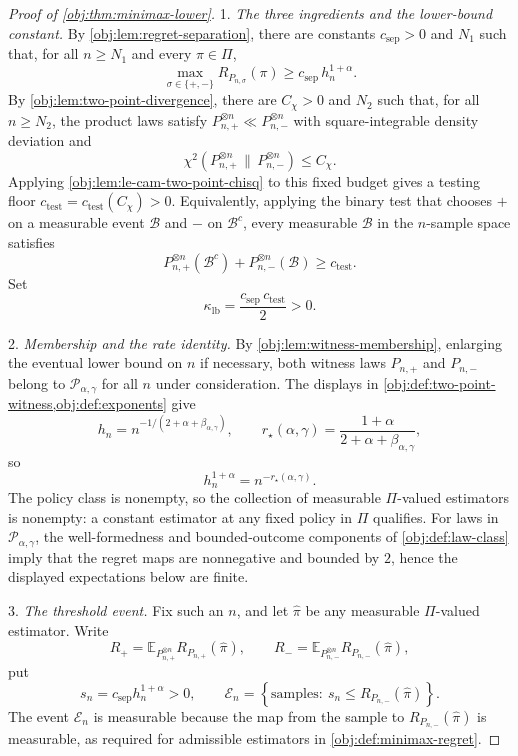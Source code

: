\begin{proof}[Proof of \cref{obj:thm:minimax-lower}]
1. \emph{The three ingredients and the lower-bound constant.}  By \cref{obj:lem:regret-separation}, there are constants \(c_{\mathrm{sep}}>0\) and \(N_1\) such that, for all \(n\ge N_1\) and every \(\pi\in\Pi\),
\[
\max_{\sigma\in\{+,-\}} R_{P_{n,\sigma}}(\pi)
\ge
c_{\mathrm{sep}}\,h_n^{1+\alpha}.
\]
By \cref{obj:lem:two-point-divergence}, there are \(C_\chi>0\) and \(N_2\) such that, for all \(n\ge N_2\), the product laws satisfy \(P_{n,+}^{\otimes n}\ll P_{n,-}^{\otimes n}\) with square-integrable density deviation and
\[
\chi^2(P_{n,+}^{\otimes n}\,\|\,P_{n,-}^{\otimes n})\le C_\chi .
\]
Applying \cref{obj:lem:le-cam-two-point-chisq} to this fixed budget gives a testing floor \(c_{\mathrm{test}}=c_{\mathrm{test}}(C_\chi)>0\).  Equivalently, applying the binary test that chooses \(+\) on a measurable event \(\mathcal B\) and \(-\) on \(\mathcal B^c\), every measurable \(\mathcal B\) in the \(n\)-sample space satisfies
\[
P_{n,+}^{\otimes n}(\mathcal B^c)+P_{n,-}^{\otimes n}(\mathcal B)
\ge c_{\mathrm{test}} .
\]
Set
\[
\kappa_{\mathrm{lb}}=\frac{c_{\mathrm{sep}}\,c_{\mathrm{test}}}{2}>0 .
\]

2. \emph{Membership and the rate identity.}  By \cref{obj:lem:witness-membership}, enlarging the eventual lower bound on \(n\) if necessary, both witness laws \(P_{n,+}\) and \(P_{n,-}\) belong to \(\mathcal P_{\alpha,\gamma}\) for all \(n\) under consideration.  The displays in \cref{obj:def:two-point-witness,obj:def:exponents} give
\[
h_n=n^{-1/(2+\alpha+\beta_{\alpha,\gamma})},
\qquad
r_\star(\alpha,\gamma)=\frac{1+\alpha}{2+\alpha+\beta_{\alpha,\gamma}},
\]
so
\[
h_n^{1+\alpha}=n^{-r_\star(\alpha,\gamma)} .
\]
The policy class is nonempty, so the collection of measurable \(\Pi\)-valued estimators is nonempty: a constant estimator at any fixed policy in \(\Pi\) qualifies.  For laws in \(\mathcal P_{\alpha,\gamma}\), the well-formedness and bounded-outcome components of \cref{obj:def:law-class} imply that the regret maps are nonnegative and bounded by \(2\), hence the displayed expectations below are finite. %

3. \emph{The threshold event.}  Fix such an \(n\), and let \(\widehat\pi\) be any measurable \(\Pi\)-valued estimator.  Write
\[
R_+
=
\mathbb E_{P_{n,+}^{\otimes n}} R_{P_{n,+}}(\widehat\pi),
\qquad
R_-
=
\mathbb E_{P_{n,-}^{\otimes n}} R_{P_{n,-}}(\widehat\pi),
\]
put
\[
s_n=c_{\mathrm{sep}}h_n^{1+\alpha}>0,
\qquad
\mathcal E_n=\left\{\text{samples}:\ s_n\le R_{P_{n,-}}(\widehat\pi)\right\}.
\]
The event \(\mathcal E_n\) is measurable because the map from the sample to \(R_{P_{n,-}}(\widehat\pi)\) is measurable, as required for admissible estimators in \cref{obj:def:minimax-regret}. %


\end{proof}
